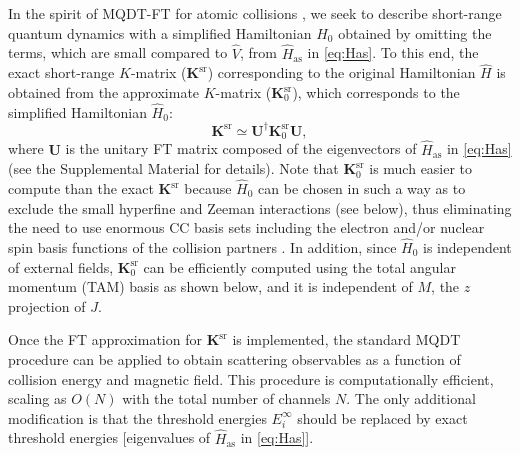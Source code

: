 \documentclass[reprint,amssymb,noeprint,twocolumn,longbibliography]{revtex4-2}
\begin{document}
In the spirit of MQDT-FT for atomic collisions  \cite{Burke_98,Burke_99,Gao_05, Hanna_09,Idziaszek_2011,Perez-Rios_15,Li_15}, we seek to describe short-range quantum dynamics with a simplified Hamiltonian $\hat{H}_\mathrm{0}$ obtained by omitting the terms, which are small compared to $\hat{V}$, from $\hat{H}_\text{as}$ in \cref{eq:Has}.
To this end, %
the exact short-range $K$-matrix 
($\bm{K}^\text{sr}$) corresponding to the original Hamiltonian $\hat{H}$ is obtained from the approximate $K$-matrix  ($\bm{K}_\mathrm{0}^{\text{sr}}$), which  
 corresponds to the simplified Hamiltonian $\hat{H}_{0}$:
\begin{equation}\label{eq:FT}
\bm{K}^\text{sr} \simeq \bm{U}^{\dagger}\bm{K}_\mathrm{0}^{\text{sr}}\bm{U},
\end{equation}
where $\bm{U}$ is the unitary FT matrix composed of the eigenvectors of $\hat{H}_\text{as}$ in \cref{eq:Has} (see the Supplemental Material \cite{SM} for details). Note that $\bm{K}_\mathrm{0}^{\text{sr}}$ is much easier to compute than the exact $\bm{K}^\text{sr}$ %
because $\hat{H}_0$ can be chosen in such a way as to exclude the small hyperfine and Zeeman interactions (see below), thus eliminating the need to use enormous CC basis sets including the electron and/or nuclear spin basis functions of the collision partners \cite{Tscherbul_23}. In addition, since $\hat{H}_0$ is independent of external fields, $\bm{K}_\mathrm{0}^{\text{sr}}$ can be efficiently computed using the total angular momentum (TAM) basis as shown below, and it is independent of $M$, the $z$ projection of $J$.

 


Once the FT approximation for $\bm{K}^\text{sr}$ is implemented, the standard MQDT procedure \cite{Mies_84,Mies_00,Raoult_04,Croft_11} 
can be applied %
to obtain scattering observables as a function of collision energy and magnetic field. This procedure is computationally efficient, scaling as $O(N)$ with the total number of channels $N$. The only additional modification is that the  threshold energies $E_i^{\infty}$ should be replaced by exact threshold energies [eigenvalues of $\hat{H}_\text{as}$ in \cref{eq:Has}].
\end{document}
